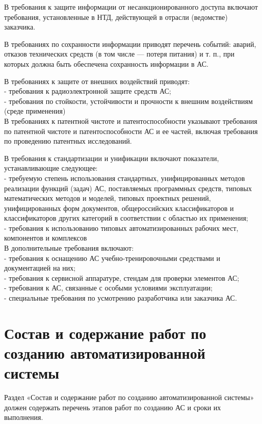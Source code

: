 {В требования к защите информации от несанкционированного доступа включают требования, установленные в НТД, действующей в отрасли (ведомстве) заказчика.

В требованиях по сохранности информации приводят перечень событий: аварий, отказов технических средств (в том числе — потеря питания) и т. п., при которых должна быть обеспечена сохранность информации в АС.

В требованиях к защите от внешних воздействий приводят:\\
- требования к радиоэлектронной защите средств АС;\\
- требования по стойкости, устойчивости и прочности к внешним воздействиям (среде применения)\\

В требованиях к патентной чистоте и патентоспособности указывают требования по патентной чистоте и патентоспособности АС и ее частей, включая требования по проведению патентных исследований.

В требования к стандартизации и унификации включают показатели, устанавливающие следующее:\\
- требуемую степень использования стандартных, унифицированных методов реализации функций (задач) АС, поставляемых программных средств, типовых математических методов и моделей, типовых проектных решений, унифицированных форм документов, общероссийских классификаторов и классификаторов других категорий в соответствии с областью их применения;\\
- требования к использованию типовых автоматизированных рабочих мест, компонентов и комплексов\\

В дополнительные требования включают:\\
- требования к оснащению АС учебно-тренировочными средствами и документацией на них;\\
- требования к сервисной аппаратуре, стендам для проверки элементов АС;\\
- требования к АС, связанные с особыми условиями эксплуатации;\\
- специальные требования по усмотрению разработчика или заказчика АС.\\

\section{Состав и содержание работ по созданию автоматизированной системы}
Раздел «Состав и содержание работ по созданию автоматизированной системы» должен содержать перечень этапов работ по созданию АС и сроки их выполнения.

}
